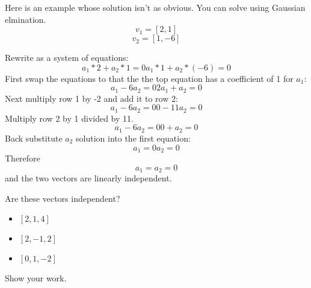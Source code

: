 Here is an example whose solution isn't as obvious. You can solve using Gaussian elmination.
$$v_1 = [2,1]$$
$$v_2 = [1,-6]$$

Rewrite as a system of equations:
$$
	a_1*2 + a_2*1 = 0 
	a_1*1 + a_2*(-6) = 0
$$
First swap the equations to that the the top equation has a coefficient of 1 for $a_1$:
$$
	a_1 - 6a_2 = 0 
	2a_1 + a_2 = 0 
$$
Next multiply row 1 by -2 and add it to row 2:
$$
	a_1 - 6a_2 = 0 
	0  - 11a_2 = 0 
$$
Multiply row 2 by 1 divided by 11.
$$
	a_1 - 6a_2 = 0 
	0  +  a_2 = 0 
$$
Back substitute $a_2$ solution into the first equation:
$$
	a_1  = 0 
	a_2 = 0 
$$
Therefore $$a_1 = a_2 = 0$$ and the two vectors are linearly independent.

\begin{Exercise}[title={Vector Independence}, label=vector_independence]
    Are these vectors independent? 
    \begin{itemize}
    \item $[2, 1, 4]$
    \item $[2, -1, 2]$ 
    \item $[0, 1, -2]$
    \end{itemize}
    Show your work.
\end{Exercise}

